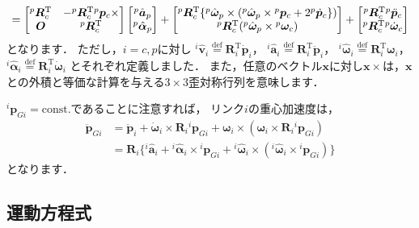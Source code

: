 ﻿\documentclass[a4paper]{jsarticle}
\begin{document}
\begin{align}
=
\left[\begin{array}{@{}cc@{}}
 {}^{p}\bm{R}_{c}^{\mathrm{T}} & -{}^{p}\bm{R}_{c}^{\mathrm{T}}{}^{p}\bm{p}_{c}\times \\
 \bm{O} & {}^{p}\bm{R}_{c}^{\mathrm{T}}
\end{array}\right]
 \left[\begin{array}{@{}c@{}}
  {}^{p}\hat{\bm{a}}_{p} \\ {}^{p}\hat{\bm{\alpha}}_{p}
 \end{array}\right]
 +\left[\begin{array}{@{}c@{}}
  {}^{p}\bm{R}_{c}^{\mathrm{T}}
  \{{}^{p}\hat{\bm{\omega}}_{p}\times({}^{p}\hat{\bm{\omega}}_{p}\times{}^{p}\bm{p}_{c}+2{}^{p}\dot{\bm{p}}_{c}\}) \\
  {}^{p}\bm{R}_{c}^{\mathrm{T}}
  ({}^{p}\hat{\bm{\omega}}_{p}\times{}^{p}\bm{\omega}_{c})
 \end{array}\right]
 +\left[\begin{array}{@{}c@{}}
  {}^{p}\bm{R}_{c}^{\mathrm{T}}{}^{p}\ddot{\bm{p}}_{c} \\
  {}^{p}\bm{R}_{c}^{\mathrm{T}}{}^{p}\dot{\bm{\omega}}_{c}
 \end{array}\right]
\label{eq:acc}
\end{align}
となります．
ただし，$i=c, p$に対し
${}^{i}\hat{\bm{v}}_{i}\overset{\mathrm{def}}{=}\bm{R}_{i}^{\mathrm{T}}\dot{\bm{p}}_{i}$，
${}^{i}\hat{\bm{a}}_{i}\overset{\mathrm{def}}{=}\bm{R}_{i}^{\mathrm{T}}\ddot{\bm{p}}_{i}$，
${}^{i}\hat{\bm{\omega}}_{i}\overset{\mathrm{def}}{=}\bm{R}_{i}^{\mathrm{T}}\bm{\omega}_{i}$，
${}^{i}\hat{\bm{\alpha}}_{i}\overset{\mathrm{def}}{=}\bm{R}_{i}^{\mathrm{T}}\dot{\bm{\omega}}_{i}$
とそれぞれ定義しました．
また，任意のベクトル$\bm{x}$に対し$\bm{x}\times$は，$\bm{x}$との外積と等価な計算を与える$3\times 3$歪対称行列を意味します．

${}^{i}\bm{p}_{Gi}=\mathrm{const.}$であることに注意すれば，
リンク$i$の重心加速度は，
\begin{align}
\ddot{\bm{p}}_{Gi}
&=\ddot{\bm{p}}_{i}
 +\dot{\bm{\omega}}_{i}\times\bm{R}_{i}{}^{i}\bm{p}_{Gi}
 +\bm{\omega}_{i}\times(\bm{\omega}_{i}\times\bm{R}_{i}{}^{i}\bm{p}_{Gi})
 \nonumber \\
&=\bm{R}_{i}\{
{}^{i}\hat{\bm{a}}_{i}
 +{}^{i}\hat{\bm{\alpha}}_{i}\times{}^{i}\bm{p}_{Gi}
 +{}^{i}\hat{\bm{\omega}}_{i}\times({}^{i}\hat{\bm{\omega}}_{i}\times{}^{i}\bm{p}_{Gi})
\}
\label{eq:com_acc}
\end{align}
となります．


\subsection{運動方程式}
\end{document}
